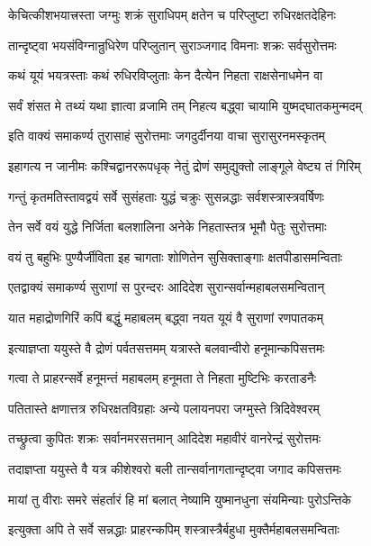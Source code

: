 \twolineshloka
{केचित्कीशभयात्त्रस्ता जग्मुः शक्रं सुराधिपम्}
{क्षतेन च परिप्लुष्टा रुधिरक्षतदेहिनः}%

\twolineshloka
{तान्दृष्ट्वा भयसंविग्नान्रुधिरेण परिप्लुतान्}
{सुराञ्जगाद विमनाः शक्रः सर्वसुरोत्तमः}%

\twolineshloka
{कथं यूयं भयत्रस्ताः कथं रुधिरविप्लुताः}
{केन दैत्येन निहता राक्षसेनाधमेन वा}%

\twolineshloka
{सर्वं शंसत मे तथ्यं यथा ज्ञात्वा व्रजामि तम्}
{निहत्य बद्ध्वा चायामि युष्मद्घातकमुन्मदम्}%

\twolineshloka
{इति वाक्यं समाकर्ण्य तुरासाहं सुरोत्तमाः}
{जगदुर्दीनया वाचा सुरासुरनमस्कृतम्}%


\twolineshloka
{इहागत्य न जानीमः कश्चिद्वानररूपधृक्}
{नेतुं द्रोणं समुद्युक्तो लाङ्गूले वेष्ट्य तं गिरिम्}%

\twolineshloka
{गन्तुं कृतमतिस्तावद्वयं सर्वे सुसंहताः}
{युद्धं चक्रुः सुसन्नद्धाः सर्वशस्त्रास्त्रवर्षिणः}%

\twolineshloka
{तेन सर्वे वयं युद्धे निर्जिता बलशालिना}
{अनेके निहतास्तत्र भूमौ पेतुः सुरोत्तमाः}%

\twolineshloka
{वयं तु बहुभिः पुण्यैर्जीविता इह चागताः}
{शोणितेन सुसिक्ताङ्गाः क्षतपीडासमन्विताः}%

\twolineshloka
{एतद्वाक्यं समाकर्ण्य सुराणां स पुरन्दरः}
{आदिदेश सुरान्सर्वान्महाबलसमन्वितान्}%

\twolineshloka
{यात महाद्रोणगिरिं कपिं बद्धुं महाबलम्}
{बद्ध्वा नयत यूयं वै सुराणां रणपातकम्}%

\twolineshloka
{इत्याज्ञप्ता ययुस्ते वै द्रोणं पर्वतसत्तमम्}
{यत्रास्ते बलवान्वीरो हनूमान्कपिसत्तमः}%

\twolineshloka
{गत्वा ते प्राहरन्सर्वे हनूमन्तं महाबलम्}
{हनूमता ते निहता मुष्टिभिः करताडनैः}%

\twolineshloka
{पतितास्ते क्षणात्तत्र रुधिरक्षतविग्रहाः}
{अन्ये पलायनपरा जग्मुस्ते त्रिदिवेश्वरम्}%

\twolineshloka
{तच्छ्रुत्वा कुपितः शक्रः सर्वानमरसत्तमान्}
{आदिदेश महावीरं वानरेन्द्रं सुरोत्तमः}%

\twolineshloka
{तदाज्ञप्ता ययुस्ते वै यत्र कीशेश्वरो बली}
{तान्सर्वानागतान्दृष्ट्वा जगाद कपिसत्तमः}%

\twolineshloka
{मायां तु वीराः समरे संहर्तारं हि मां बलात्}
{नेष्यामि युष्मानधुना संयमिन्याः पुरोऽन्तिके}%

\twolineshloka
{इत्युक्ता अपि ते सर्वे सन्नद्धाः प्राहरन्कपिम्}
{शस्त्रास्त्रैर्बहुधा मुक्तैर्महाबलसमन्विताः}%

